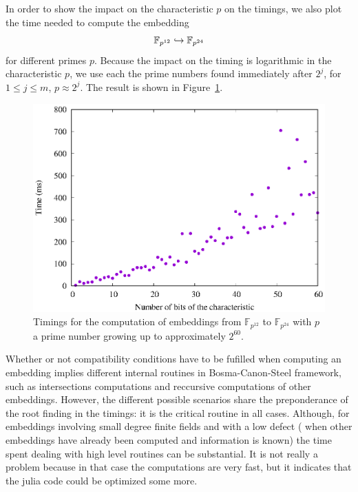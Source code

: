 In order to show the impact on the characteristic $p$ on the timings, we also
plot the time needed to compute the embedding
\[
  \mathbb{F}_{p^{12}}\hookrightarrow\mathbb{F}_{p^{24}}
\]
for different primes $p$. Because the impact on the timing is logarithmic in the
characteristic $p$, we use each the prime numbers found immediately after $2^j$,
for $1\leq j\leq m$, \ie $p\approx 2^j$. The result is shown in
Figure~\ref{fig:bcs-embed-primes}.
\begin{figure}
  \centering
  \includegraphics{benchmarks/lattice-bcs/embed-primes-exp.eps}
  \caption{Timings for the computation of embeddings from $\mathbb{F}_{p^{12}}$
  to $\mathbb{F}_{p^{24}}$ with $p$ a prime number growing up to approximately
  $2^{60}$.}
  \label{fig:bcs-embed-primes}
\end{figure}
Whether or not compatibility conditions have to be fufilled when computing an
embedding implies different internal routines in Bosma-Canon-Steel framework,
such as intersections computations and reccursive computations of other
embeddings. However, the different possible scenarios share the preponderance of the
root finding in the timings: it is the critical routine in all cases. Although,
for embeddings involving small degree finite fields and with a low defect (\ie
when other embeddings have already been computed and information is known) the
time spent dealing with high level routines can be substantial. It is not
really a problem because in that case the computations are very fast, but it
indicates that the julia code could be optimized some more.

%
